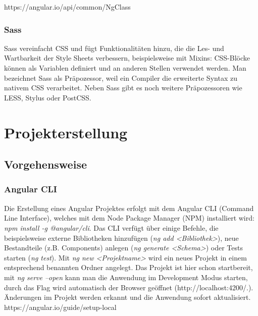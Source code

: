 https://angular.io/api/common/NgClass

\subsubsection{Sass}
Sass vereinfacht CSS und fügt Funktionalitäten hinzu, die die Les- und Wartbarkeit der Style Sheets verbessern, beispielsweise mit Mixins: CSS-Blöcke können als Variablen definiert und an anderen Stellen verwendet werden. Man bezeichnet Sass als Präpozessor, weil ein Compiler die erweiterte Syntax zu nativem CSS verarbeitet. Neben Sass gibt es noch weitere Präpozessoren wie LESS, Stylus oder PostCSS. 



\section{Projekterstellung}
\subsection{Vorgehensweise}
\subsubsection{Angular CLI}
Die Erstellung eines Angular Projektes erfolgt mit dem Angular CLI (Command Line Interface), welches mit dem Node Package Manager (NPM) installiert wird: \textit{npm install -g @angular/cli}. Das CLI verfügt über einige Befehle, die beispielsweise externe Bibliotheken hinzufügen (\textit{ng add <Bibliothek>}), neue Bestandteile (z.B. Components) anlegen (\textit{ng generate <Schema>}) oder Tests starten (\textit{ng test}). Mit \textit{ng new <Projektname>} wird ein neues Projekt in einem entsprechend benannten Ordner angelegt. Das Projekt ist hier schon startbereit, mit \textit{ng serve --open} kann man die Anwendung im Development Modus starten, durch das Flag wird automatisch der Browser geöffnet (http://localhost:4200/.). Änderungen im Projekt werden erkannt und die Anwendung sofort aktualisiert.
https://angular.io/guide/setup-local

